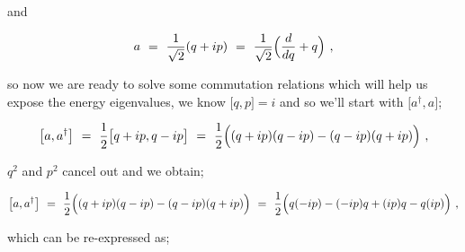 \documentclass{article}
\begin{document}
and

\begin{equation} \label{eq:256}
a \hspace{0.125cm} = \hspace{0.125cm} \frac{1}{\sqrt{2}} ( q + i p)  \hspace{0.125cm} = \hspace{0.125cm} \frac{1}{\sqrt{2}} \Big( \frac{d}{dq} + q \Big)  \hspace{0.125cm} ,
\end{equation}

so now we are ready to solve some commutation relations which will help us expose the energy eigenvalues, we know \begin{math} \big[ q , p \big] = i \end{math} and so we'll start with \begin{math} \big[ a^{\dagger} , a \big]  \end{math};

\begin{equation} \label{eq:256}
\big[ a , a^{\dagger} \big] \hspace{0.125cm} = \hspace{0.125cm} \frac{1}{2} \big[ q + ip , q - ip \big] \hspace{0.125cm} = \hspace{0.125cm} \frac{1}{2} \Big( ( q + ip )( q - ip ) - ( q - ip )( q + ip ) \Big) \hspace{0.125cm} ,
\end{equation}

\begin{math} q^2 \end{math} and \begin{math} p^2 \end{math} cancel out and we obtain;

\begin{equation} \label{eq:256}
\big[ a , a^{\dagger} \big] \hspace{0.125cm} = \hspace{0.125cm} \frac{1}{2} \Big( ( q + ip )( q - ip ) - ( q - ip )( q + ip ) \Big) \hspace{0.125cm} = \hspace{0.125cm} \frac{1}{2} \Big( q ( -i p ) - ( - i p ) q + ( i p ) q - q ( i p ) \Big) \hspace{0.125cm} ,
\end{equation}

which can be re-expressed as;
\end{document}
